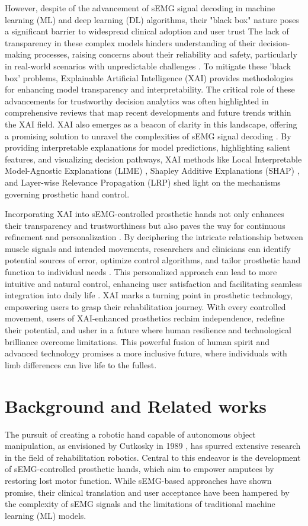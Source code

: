 \documentclass[preprint,12pt]{elsarticle}
\begin{document}
However, despite of the advancement of sEMG signal decoding in machine learning (ML) and deep learning (DL) algorithms, their "black box" nature poses a significant barrier to widespread clinical adoption and user trust \cite{4} The lack of transparency in these complex models hinders understanding of their decision-making processes, raising concerns about their reliability and safety, particularly in real-world scenarios with unpredictable challenges \cite{5}. To mitigate these 'black box' problems, Explainable Artificial Intelligence (XAI) provides methodologies for enhancing model transparency and interpretability. The critical role of these advancements for trustworthy decision analytics was often highlighted in comprehensive reviews that map recent developments and future trends within the XAI field\cite{saranya2023systematic}. XAI also emerges as a beacon of clarity in this landscape, offering a promising solution to unravel the complexities of sEMG signal decoding \cite{6}. By providing interpretable explanations for model predictions, highlighting salient features, and visualizing decision pathways, XAI methods like Local Interpretable Model-Agnostic Explanations (LIME) \cite{7}, Shapley Additive Explanations (SHAP) \cite{8}, and Layer-wise Relevance Propagation (LRP) \cite{9} shed light on the mechanisms governing prosthetic hand control.

Incorporating XAI into sEMG-controlled prosthetic hands not only enhances their transparency and trustworthiness but also paves the way for continuous refinement and personalization \cite{10}. By deciphering the intricate relationship between muscle signals and intended movements, researchers and clinicians can identify potential sources of error, optimize control algorithms, and tailor prosthetic hand function to individual needs \cite{11}. This personalized approach can lead to more intuitive and natural control, enhancing user satisfaction and facilitating seamless integration into daily life \cite{12}. XAI marks a turning point in prosthetic technology, empowering users to grasp their rehabilitation journey. With every controlled movement, users of XAI-enhanced prosthetics reclaim independence, redefine their potential, and usher in a future where human resilience and technological brilliance overcome limitations. This powerful fusion of human spirit and advanced technology promises a more inclusive future, where individuals with limb differences can live life to the fullest.

\section{Background and Related works}
The pursuit of creating a robotic hand capable of autonomous object manipulation, as envisioned by Cutkosky in 1989 \cite{13}, has spurred extensive research in the field of rehabilitation robotics. Central to this endeavor is the development of sEMG-controlled prosthetic hands, which aim to empower amputees by restoring lost motor function. While sEMG-based approaches have shown promise, their clinical translation and user acceptance have been hampered by the complexity of sEMG signals and the limitations of traditional machine learning (ML) models.
\end{document}
